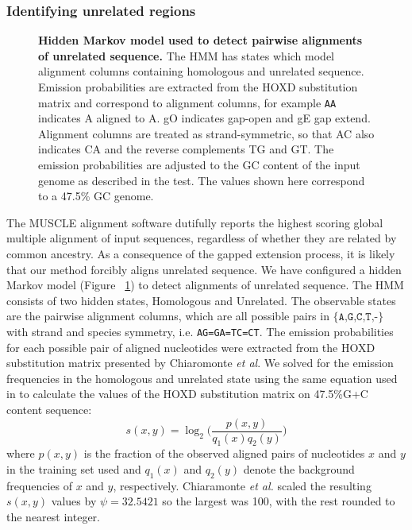 \documentclass{llncs}
\begin{document}
\subsubsection{Identifying unrelated regions}
\begin{figure}[t]
\centering {}
\caption{\textbf{Hidden Markov model used to detect pairwise alignments of unrelated
sequence.} \scriptsize The HMM has states which model alignment columns containing
homologous and unrelated sequence. Emission probabilities are extracted from the HOXD substitution matrix and correspond to alignment
columns, for example \texttt{AA} indicates A aligned to A.  gO
indicates gap-open and gE gap extend. Alignment columns are treated as
strand-symmetric, so that AC also indicates CA and the reverse
complements TG and GT.  The emission probabilities are adjusted to the GC content of the input genome
as described in the test.  The values shown here correspond to a 47.5\% GC genome.}
\label{fig-hmm}\vspace{-0.2cm}
\end{figure}
The MUSCLE alignment software dutifully reports the highest scoring
global multiple alignment of input sequences, regardless of whether
they are related by common ancestry. As a consequence of the gapped
extension process, it is likely that our method forcibly aligns unrelated
sequence. We have configured a hidden Markov model (Figure
~\ref{fig-hmm}) to detect alignments of unrelated sequence. The HMM
consists of two hidden states, Homologous and Unrelated. The
observable states are the pairwise alignment columns, which are all
possible pairs in $\texttt{{\{A,G,C,T,-\}}}$ with strand and species
symmetry, i.e. \texttt{AG=GA=TC=CT}. The emission probabilities for
each possible pair of aligned nucleotides were extracted from the HOXD
substitution matrix presented by Chiaromonte \textit{et al}\cite{hoxd}.
We solved for the emission frequencies in the
homologous and unrelated state using the same equation used in to
calculate the values of the HOXD substitution matrix on 47.5\%G+C
content sequence\cite{hoxd}:
\begin{equation}
s(x,y)= \log_{2}{\Bigg(\frac{p(x,y)}{q_{1}(x)q_{2}(y)}\Bigg)}
\end{equation}
{w}here $p(x,y)$ is the fraction of the observed aligned pairs of
nucleotides $x$ and $y$ in the training set used and $q_{1}(x)$ and
$q_{2}(y)$ denote the background frequencies of $x$ and $y$,
respectively. Chiaramonte \textit{et al.} scaled the resulting
$s(x,y)$ values by $\psi=32.5421$ so the largest was 100,
with the rest rounded to the nearest integer.
\end{document}
